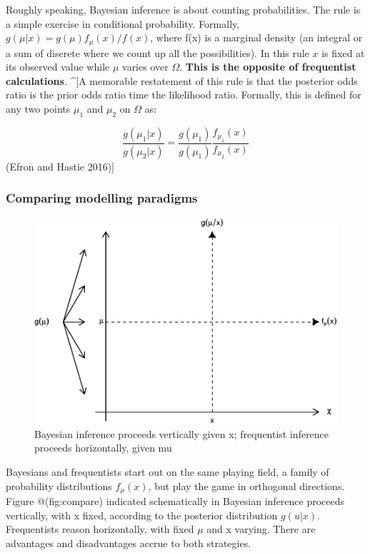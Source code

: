 \documentclass{article}
\begin{document}
Roughly speaking, Bayesian inference is about counting probabilities.
The rule is a simple exercise in conditional probability. Formally,
\(g(\mu|x)=g(\mu)f_{\mu}(x)/f(x)\), where f(x) is a marginal density (an
integral or a sum of discrete where we count up all the possibilities).
In this rule \(x\) is fixed at its observed value while \(\mu\) varies
over \(\Omega\). \textbf{This is the opposite of frequentist
calculations}. \^{}{[}A memorable restatement of this rule is that the
posterior odds ratio is the prior odds ratio time the likelihood ratio.
Formally, this is defined for any two points \(\mu_1\) and \(\mu_2\) on
\(\Omega\) as:

\[\frac{g(\mu_1|x)}{g(\mu_2|x)}=\frac{g(\mu_1)}{g(\mu_1)}\frac{f_{\mu_1}(x)}{f_{\mu_2}(x)}\]
(Efron and Hastie 2016){]}

\hypertarget{comparing-modelling-paradigms}{%
\subsubsection{Comparing modelling
paradigms}\label{comparing-modelling-paradigms}}

\begin{figure}

{\centering \includegraphics{qrap_paper_files/figure-latex/compare-1} 

}

\caption{Bayesian inference proceeds vertically given x; frequentist inference proceeds horizontally, given mu}\label{fig:compare}
\end{figure}

Bayesians and frequentists start out on the same playing field, a family
of probability distributions \(f_{\mu}(x)\), but play the game in
orthogonal directions. Figure @(fig:compare) indicated schematically in
Bayesian inference proceeds vertically, with x fixed, according to the
posterior distribution \(g(u|x)\). Frequentists reason horizontally,
with fixed \(\mu\) and x varying. There are advantages and disadvantages
accrue to both strategies.
\end{document}

